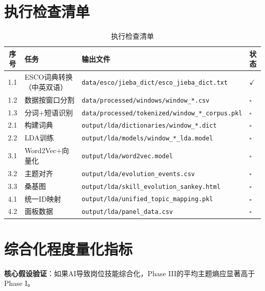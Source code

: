 \documentclass[12pt, a4paper]{ctexart}
\newenvironment{note}{%
  \begin{tcolorbox}[colback=blue!5, colframe=blue!50!black, boxrule=0.5pt, arc=2pt, breakable, title=\textbf{说明}]
}{%
  \end{tcolorbox}
}
\begin{document}
\section{执行检查清单}

\begin{table}[h]
\centering
\caption{执行检查清单}
\begin{tabular}{clll}
\toprule
\textbf{序号} & \textbf{任务} & \textbf{输出文件} & \textbf{状态} \\
\midrule
1.1 & ESCO词典转换（中英双语） & \texttt{data/esco/jieba\_dict/esco\_jieba\_dict.txt} & $\checkmark$ \\
1.2 & 数据按窗口分割 & \texttt{data/processed/windows/window\_*.csv} & $\square$ \\
1.3 & 分词+短语识别 & \texttt{data/processed/tokenized/window\_*\_corpus.pkl} & $\square$ \\
\midrule
2.1 & 构建词典 & \texttt{output/lda/dictionaries/window\_*.dict} & $\square$ \\
2.2 & LDA训练 & \texttt{output/lda/models/window\_*\_lda.model} & $\square$ \\
\midrule
3.1 & Word2Vec+向量化 & \texttt{output/lda/word2vec.model} & $\square$ \\
3.2 & 主题对齐 & \texttt{output/lda/evolution\_events.csv} & $\square$ \\
3.3 & 桑基图 & \texttt{output/lda/skill\_evolution\_sankey.html} & $\square$ \\
\midrule
4.1 & 统一ID映射 & \texttt{output/lda/unified\_topic\_mapping.pkl} & $\square$ \\
4.2 & 面板数据 & \texttt{output/lda/panel\_data.csv} & $\square$ \\
\bottomrule
\end{tabular}
\end{table}

\section{综合化程度量化指标}

\begin{note}
\textbf{核心假设验证}：如果AI导致岗位技能综合化，Phase III的平均主题熵应显著高于Phase I。
\end{note}
\end{document}
